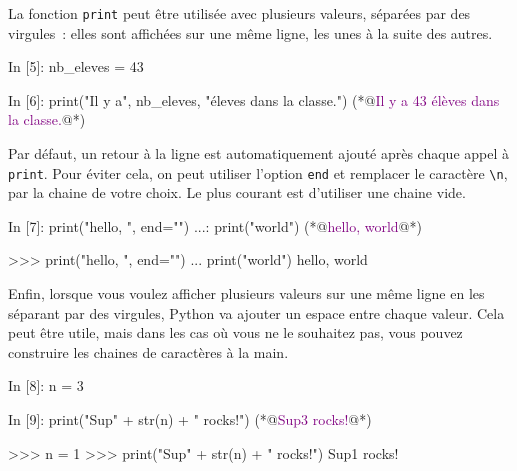 \documentclass{magnolia}
\begin{document}
La fonction \verb_print_ peut être utilisée avec plusieurs valeurs, séparées par des 
virgules~: elles sont affichées sur une même ligne, les unes à la suite des autres.

\begin{pythoncode}
In [5]: nb_eleves = 43

In [6]: print("Il y a", nb_eleves, "éleves dans la classe.")
(*@\textcolor{purple}{Il y a 43 élèves dans la classe.}@*)
\end{pythoncode}

\noindent
Par défaut, un retour à la ligne est automatiquement ajouté après chaque appel à
\verb_print_. Pour éviter cela, on peut utiliser l'option \verb_end_ et remplacer le
caractère \og\verb_\n_\fg, par la chaine de votre choix. Le plus courant est d'utiliser
une chaine vide.

\begin{francois}
\begin{pythoncode}
In [7]: print("hello, ", end="")
   ...: print("world")
(*@\textcolor{purple}{hello, world}@*)
\end{pythoncode}
\end{francois}
\begin{victor}
\begin{pythoncode}
>>> print("hello, ", end="")
... print("world")
hello, world
\end{pythoncode}
\end{victor}

\noindent
Enfin, lorsque vous voulez afficher plusieurs valeurs sur une même ligne en les séparant par
des virgules, Python va ajouter un espace entre chaque valeur. Cela peut être utile, mais 
dans les cas où vous ne le souhaitez pas, vous pouvez construire les chaines de 
caractères à la main.

\begin{francois}
\begin{pythoncode}
In [8]: n = 3

In [9]: print("Sup" + str(n) + " rocks!")
(*@\textcolor{purple}{Sup3 rocks!}@*)
\end{pythoncode}
\end{francois}
\begin{victor}
\begin{pythoncode}
>>> n = 1
>>> print("Sup" + str(n) + " rocks!")
Sup1 rocks!
\end{pythoncode}
\end{victor}
\end{document}
